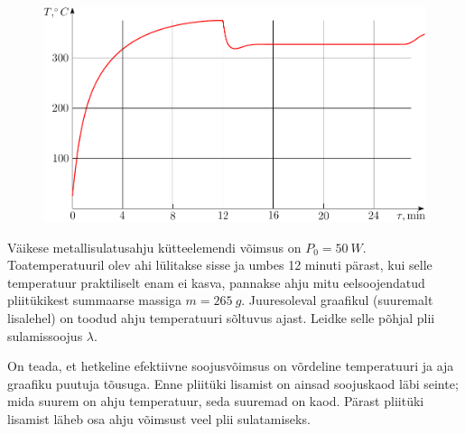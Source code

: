 
\begin{figure}%
\includegraphics[width=\linewidth]{2012-v3g-07-ahi_graafik}%
\end{figure}
Väikese metallisulatusahju kütteelemendi võimsus on $P_0 = \SI{50}{W}$.
Toatemperatuuril olev ahi lülitakse sisse ja umbes 12 minuti pärast,
kui selle temperatuur praktiliselt enam ei kasva, pannakse ahju mitu
eelsoojendatud pliitükikest summaarse massiga $m = \SI{265}{g}$. Juuresoleval graafikul (suuremalt
lisalehel) on toodud
ahju temperatuuri sõltuvus ajast. Leidke selle põhjal plii sulamissoojus
$\lambda$.

\hint
On teada, et hetkeline efektiivne soojusvõimsus on võrdeline temperatuuri ja aja graafiku puutuja tõusuga. Enne pliitüki lisamist on ainsad soojuskaod läbi seinte; mida suurem on ahju temperatuur, seda suuremad on kaod. Pärast pliitüki lisamist läheb osa ahju võimsust veel plii sulatamiseks.

